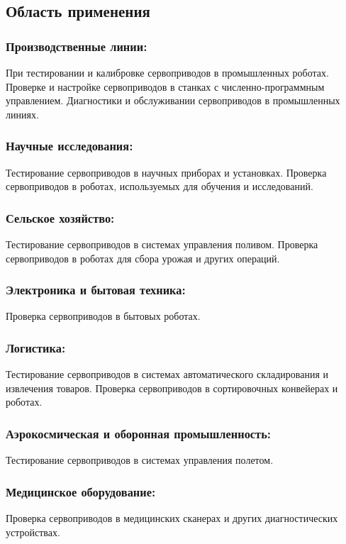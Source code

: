 \documentclass[a4paper]{bsuir-tor}
\begin{document}
\subsection{Область применения}


  \subsubsection{Производственные линии: }
  При тестировании и калибровке сервоприводов в промышленных роботах.
  Проверке и настройке сервоприводов в станках с численно-программным
  управлением. Диагностики и обслуживании сервоприводов в промышленных
  линиях.
  
  \subsubsection{Научные исследования: }
  Тестирование сервоприводов в научных приборах и установках.
  Проверка сервоприводов в роботах, используемых для обучения и
  исследований.
 
  \subsubsection{Сельское хозяйство: }
  Тестирование сервоприводов в системах управления поливом.
  Проверка сервоприводов в роботах для сбора урожая и других операций.
  
  \subsubsection{Электроника и бытовая техника: }
  Проверка сервоприводов в бытовых роботах.
  
  \subsubsection{Логистика: }
  Тестирование сервоприводов в системах автоматического складирования
  и извлечения товаров.
  Проверка сервоприводов в сортировочных конвейерах и роботах.


  \subsubsection{Аэрокосмическая и оборонная промышленность: }
  Тестирование сервоприводов в системах управления полетом.

  \subsubsection{Медицинское оборудование: }
  Проверка сервоприводов в медицинских сканерах и других
  диагностических устройствах.
\end{document}
